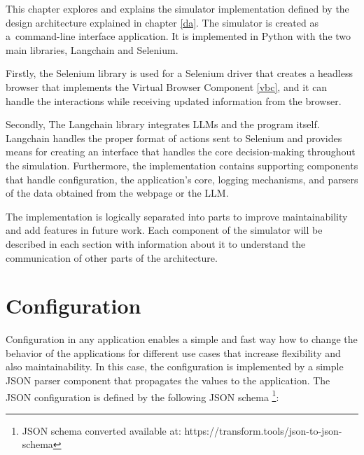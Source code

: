 This chapter explores and explains the simulator implementation defined by the design architecture explained in chapter \ref{da}. The simulator is created as a~command-line interface application. It is implemented in Python with the two main libraries, Langchain and Selenium. 

Firstly, the Selenium library is used for a Selenium driver that creates a headless browser that implements the Virtual Browser Component \ref{vbc}, and it can handle the interactions while receiving updated information from the browser. 

Secondly, The Langchain library integrates LLMs and the program itself. Langchain handles the proper format of actions sent to Selenium and provides means for creating an interface that handles the core decision-making throughout the simulation. Furthermore, the implementation contains supporting components that handle configuration, the application's core, logging mechanisms, and parsers of the data obtained from the webpage or the LLM. 

The implementation is logically separated into parts to improve maintainability and add features in future work. Each component of the simulator will be described in each section with information about it to understand the communication of other parts of the architecture.


\section{Configuration}
\label{conf}

Configuration in any application enables a simple and fast way how to change the behavior of the applications for different use cases that increase flexibility and also maintainability. In this case, the configuration is implemented by a simple JSON parser component that propagates the values to the application. The JSON configuration is defined by the following JSON schema \footnote{JSON schema converted available at: https://transform.tools/json-to-json-schema}:

